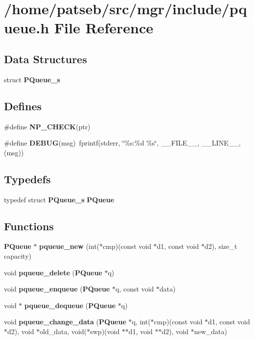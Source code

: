 \section{/home/patseb/src/mgr/include/pqueue.h File Reference}
\label{pqueue_8h}
\subsection*{Data Structures}
\begin{DoxyCompactItemize}
\item 
struct {\bf P\-Queue\-\_\-s}
\end{DoxyCompactItemize}
\subsection*{Defines}
\begin{DoxyCompactItemize}
\item 
\#define {\bf N\-P\-\_\-\-C\-H\-E\-C\-K}(ptr)
\item 
\#define {\bf D\-E\-B\-U\-G}(msg)~fprintf(stderr, \char`\"{}\%s\-:\%d \%s\char`\"{}, \-\_\-\-\_\-\-F\-I\-L\-E\-\_\-\-\_\-, \-\_\-\-\_\-\-L\-I\-N\-E\-\_\-\-\_\-, (msg))
\end{DoxyCompactItemize}
\subsection*{Typedefs}
\begin{DoxyCompactItemize}
\item 
typedef struct {\bf P\-Queue\-\_\-s} {\bf P\-Queue}
\end{DoxyCompactItemize}
\subsection*{Functions}
\begin{DoxyCompactItemize}
\item 
{\bf P\-Queue} $\ast$ {\bf pqueue\-\_\-new} (int($\ast$cmp)(const void $\ast$d1, const void $\ast$d2), size\-\_\-t capacity)
\item 
void {\bf pqueue\-\_\-delete} ({\bf P\-Queue} $\ast$q)
\item 
void {\bf pqueue\-\_\-enqueue} ({\bf P\-Queue} $\ast$q, const void $\ast$data)
\item 
void $\ast$ {\bf pqueue\-\_\-dequeue} ({\bf P\-Queue} $\ast$q)
\item 
void {\bf pqueue\-\_\-change\-\_\-data} ({\bf P\-Queue} $\ast$q, int($\ast$cmp)(const void $\ast$d1, const void $\ast$d2), void $\ast$old\-\_\-data, void($\ast$swp)(void $\ast$$\ast$d1, void $\ast$$\ast$d2), void $\ast$new\-\_\-data)
\end{DoxyCompactItemize}


